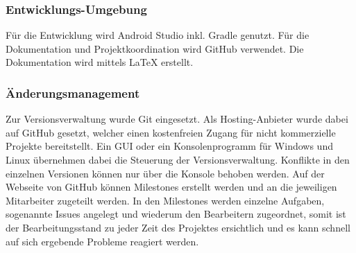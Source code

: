 \subsubsection{Entwicklungs-Umgebung}
Für die Entwicklung wird Android Studio inkl. Gradle genutzt. Für die Dokumentation und Projektkoordination wird GitHub verwendet.
Die Dokumentation wird mittels \LaTeX{} erstellt.



%
%
%
%
%



\subsubsection{Änderungsmanagement}
Zur Versionsverwaltung wurde Git eingesetzt. Als Hosting-Anbieter wurde dabei auf GitHub gesetzt, welcher einen kostenfreien Zugang für nicht kommerzielle Projekte bereitstellt. Ein \ac{GUI} oder ein Konsolenprogramm für Windows und Linux übernehmen dabei die Steuerung der Versionsverwaltung. Konflikte in den einzelnen Versionen können nur über die Konsole behoben werden. Auf der Webseite von GitHub können Milestones erstellt werden und an die jeweiligen Mitarbeiter zugeteilt werden. In den Milestones werden einzelne Aufgaben, sogenannte Issues angelegt und wiederum den Bearbeitern zugeordnet, somit ist der Bearbeitungsstand zu jeder Zeit des Projektes ersichtlich und es kann schnell auf sich ergebende Probleme reagiert werden.



